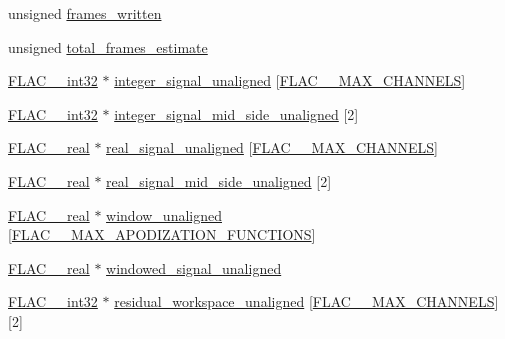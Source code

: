 \begin{DoxyCompactItemize}
\item 
unsigned \hyperlink{struct_f_l_a_c_____stream_encoder_private_a41114a347bfc3c1cec8e23bf650f95d1}{frames\+\_\+written}
\item 
unsigned \hyperlink{struct_f_l_a_c_____stream_encoder_private_a5c67db622829bf85f2467d13e4631719}{total\+\_\+frames\+\_\+estimate}
\item 
\hyperlink{ordinals_8h_a33fd77bfe6d685541a0c034a75deccdc}{F\+L\+A\+C\+\_\+\+\_\+int32} $\ast$ \hyperlink{struct_f_l_a_c_____stream_encoder_private_a95806af8c783db29c9f4d172aba69c2e}{integer\+\_\+signal\+\_\+unaligned} \mbox{[}\hyperlink{group__flac__format_ga488aa5678a58d08f984f5d39185b763d}{F\+L\+A\+C\+\_\+\+\_\+\+M\+A\+X\+\_\+\+C\+H\+A\+N\+N\+E\+LS}\mbox{]}
\item 
\hyperlink{ordinals_8h_a33fd77bfe6d685541a0c034a75deccdc}{F\+L\+A\+C\+\_\+\+\_\+int32} $\ast$ \hyperlink{struct_f_l_a_c_____stream_encoder_private_aaca9f0cc8f6e39a1df29bbaf3bf468fa}{integer\+\_\+signal\+\_\+mid\+\_\+side\+\_\+unaligned} \mbox{[}2\mbox{]}
\item 
\hyperlink{float_8h_a72409a67c78d2af7d29a9e9362cd49b8}{F\+L\+A\+C\+\_\+\+\_\+real} $\ast$ \hyperlink{struct_f_l_a_c_____stream_encoder_private_a749bd8576ec48d4a732aed02d94423fd}{real\+\_\+signal\+\_\+unaligned} \mbox{[}\hyperlink{group__flac__format_ga488aa5678a58d08f984f5d39185b763d}{F\+L\+A\+C\+\_\+\+\_\+\+M\+A\+X\+\_\+\+C\+H\+A\+N\+N\+E\+LS}\mbox{]}
\item 
\hyperlink{float_8h_a72409a67c78d2af7d29a9e9362cd49b8}{F\+L\+A\+C\+\_\+\+\_\+real} $\ast$ \hyperlink{struct_f_l_a_c_____stream_encoder_private_a2fdc4bee750e19e7116cc1f7122bd9f3}{real\+\_\+signal\+\_\+mid\+\_\+side\+\_\+unaligned} \mbox{[}2\mbox{]}
\item 
\hyperlink{float_8h_a72409a67c78d2af7d29a9e9362cd49b8}{F\+L\+A\+C\+\_\+\+\_\+real} $\ast$ \hyperlink{struct_f_l_a_c_____stream_encoder_private_a14ae296508bb7af62fe189452c1be0a9}{window\+\_\+unaligned} \mbox{[}\hyperlink{src_2lib_f_l_a_c_2include_2protected_2stream__encoder_8h_ad9a5c4c2d9c054daf37639087480ad17}{F\+L\+A\+C\+\_\+\+\_\+\+M\+A\+X\+\_\+\+A\+P\+O\+D\+I\+Z\+A\+T\+I\+O\+N\+\_\+\+F\+U\+N\+C\+T\+I\+O\+NS}\mbox{]}
\item 
\hyperlink{float_8h_a72409a67c78d2af7d29a9e9362cd49b8}{F\+L\+A\+C\+\_\+\+\_\+real} $\ast$ \hyperlink{struct_f_l_a_c_____stream_encoder_private_a9cfb49f065077db942b28591f5488367}{windowed\+\_\+signal\+\_\+unaligned}
\item 
\hyperlink{ordinals_8h_a33fd77bfe6d685541a0c034a75deccdc}{F\+L\+A\+C\+\_\+\+\_\+int32} $\ast$ \hyperlink{struct_f_l_a_c_____stream_encoder_private_a802b132a77b863b9d854d5f8cbe3090e}{residual\+\_\+workspace\+\_\+unaligned} \mbox{[}\hyperlink{group__flac__format_ga488aa5678a58d08f984f5d39185b763d}{F\+L\+A\+C\+\_\+\+\_\+\+M\+A\+X\+\_\+\+C\+H\+A\+N\+N\+E\+LS}\mbox{]}\mbox{[}2\mbox{]}

\end{DoxyCompactItemize}
